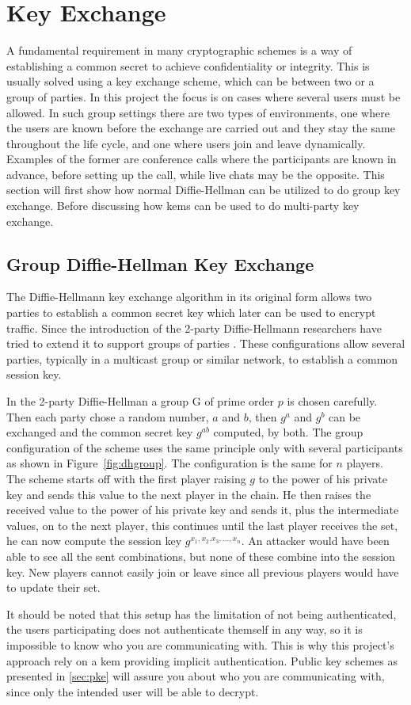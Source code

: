 \section{Key Exchange}\label{sec:key_exchange}
A fundamental requirement in many cryptographic schemes is a way of establishing a common secret to achieve confidentiality or integrity. This is usually solved using a key exchange scheme, which can be between two or a group of parties. In this project the focus is on cases where several users must be allowed. In such group settings there are two types of environments, one where the users are known before the exchange are carried out and they stay the same throughout the life cycle, and one where users join and leave dynamically. Examples of the former are conference calls where the participants are known in advance, before setting up the call, while live chats may be the opposite. This section will first show how normal Diffie-Hellman can be utilized to do group key exchange. Before discussing how \glspl{kem} can be used to do multi-party key exchange.

\subsection{Group Diffie-Hellman Key Exchange}\label{subsec:DH}
The Diffie-Hellmann key exchange algorithm in its original form allows two parties to establish a common secret key which later can be used to encrypt traffic. Since the introduction of the 2-party Diffie-Hellmann researchers have tried to extend it to support groups of parties \cite{steiner1996diffie, groupDH}. These configurations allow several parties, typically in a multicast group or similar network, to establish a common session key. 
\par In the 2-party Diffie-Hellman a group G of prime order $p$ is chosen carefully. Then each party chose a random number, $a$ and $b$, then $g^a$ and $g^b$ can be exchanged and the common secret key $g^{ab}$ computed, by both. The group configuration of the scheme uses the same principle only with several participants as shown in Figure~\ref{fig:dhgroup}. The configuration is the same for $n$ players. The scheme starts off with the first player raising $g$ to the power of his private key and sends this value to the next player in the chain. He then raises the received value to the power of his private key and sends it, plus the intermediate values, on to the next player, this continues until the last player receives the set, he can now compute the session key $g^{x_1,x_2.x_3,...,x_n}$. An attacker would have been able to see all the sent combinations, but none of these combine into the session key. New players cannot easily join or leave since all previous players would have to update their set. 
\par It should be noted that this setup has the limitation of not being authenticated, the users participating does not authenticate themself in any way, so it is impossible to know who you are communicating with. This is why this project's approach rely on a \gls{kem} providing implicit authentication. Public key schemes as presented in \ref{sec:pke} will assure you about who you are communicating with, since only the intended user will be able to decrypt. 

